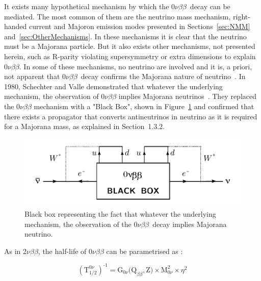 \documentclass[main.tex]{subfiles}
\begin{document}
\bigskip



\NI It exists many hypothetical mechanism by which the 0$\nu\beta\beta$~decay can be mediated. The most common of them are the neutrino mass mechanism, right-handed current and Majoron emission modes presented in Sections~\ref{sec:NMM} and~\ref{sec:OtherMechanisms}. In these mechanisms it is clear that the neutrino must be a Majorana particle. But it also exists other mechanisms, not presented herein, such as R-parity violating supersymmetry or extra dimensions to explain 0$\nu\beta\beta$. In some of these mechanisms, no neutrino are involved and it is, a priori, not apparent that 0$\nu\beta\beta$~decay confirms the Majorana nature of neutrino~\cite{SUSYandDBD}. In 1980, Schechter and Valle demonstrated that whatever the underlying mechanism, the observation of 0$\nu\beta\beta$ implies Majorana neutrinos~\cite{SchechterValle}. They replaced the 0$\nu\beta\beta$ mechanism with a "Black Box", shown in Figure~\ref{0nubbBlackBox} and confirmed that there exists a propagator that converts antineutrinos in neutrino as it is required for a Majorana mass, as explained in Section~1.3.2. 

\smallskip

\begin{figure}[h!]
\begin{center}
\includegraphics[scale=0.9]{pictures/Chap2/0nubbBlackBox.pdf}
\caption{Black box representing the fact that whatever the underlying mechanism, the observation of the 0$\nu\beta\beta$~decay implies Majorana neutrino.}
\label{0nubbBlackBox}
\end{center}
\end{figure}


\bigskip


\NI As in 2$\nu\beta\beta$, the half-life of 0$\nu\beta\beta$ can be parametrised as : 


\begin{equation}\label{eq:halflife0nu}
(\text{T}_{\text{1/2}}^{\text{0}\nu})^{\text{-1}} = \text{G}_{\text{0}\nu}\text{(Q}_{\beta\beta},\text{Z)} \times \text{M}^\text{2}_{\text{0}\nu} \times \eta^\text{2}
\end{equation}
\end{document}

